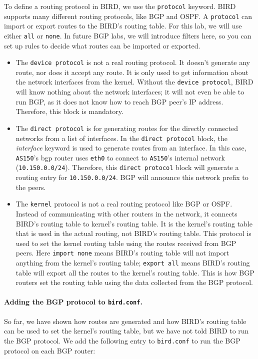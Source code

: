 To define a routing protocol in BIRD, we use the \texttt{protocol} keyword.
BIRD supports many different routing protocols, like BGP and OSPF. A
\texttt{protocol} can import or export routes to the BIRD's routing table.
For this lab, we will use either \texttt{all} or \texttt{none}. In future 
BGP labs, we will introduce filters here, so you can set up 
rules to decide what routes can be imported or exported. 

\begin{itemize}

\item The \texttt{device protocol} is not a real routing protocol. It doesn't
generate any route, nor does it accept any route. It is only used to get
information about the network interfaces from the kernel. Without the
\texttt{device protocol}, BIRD will know nothing about the network
interfaces; it will not even be able to run BGP, as it does not know how
to reach BGP peer's IP address. Therefore, this block is mandatory.

\item The \texttt{direct protocol} is for generating routes for the directly
connected networks from a list of interfaces. In the \texttt{direct protocol}
block, the \textit{interface} keyword is used to generate routes from an
interface. In this case, \texttt{AS150}'s bgp router uses \texttt{eth0} to
connect to \texttt{AS150}'s internal network (\texttt{10.150.0.0/24}).
Therefore, this \texttt{direct protocol} block will generate a routing
entry for \texttt{10.150.0.0/24}. BGP will announce this network
prefix to the peers.

\item The \texttt{kernel} protocol is not a real routing protocol like BGP or
OSPF. Instead of communicating with other routers in the network, it connects
BIRD's routing table to kernel's routing table. It is the kernel's routing table 
that is used in the actual routing, not BIRD's routing table. 
This protocol is used to set the kernel routing table using the routes 
received from BGP peers. Here
\texttt{import none} means BIRD's routing table will not import anything from
the kernel's routing table; \texttt{export all} means BIRD's routing table
will export all the routes to the kernel's routing table. This is how BGP
routers set the routing table using the data collected from the BGP
protocol.

\end{itemize}


\paragraph{Adding the BGP protocol to \texttt{bird.conf}.} 
So far, we have shown how routes are generated and how BIRD's routing table can
be used to set the kernel's routing table, but we have not told BIRD to 
run the BGP protocol. We add the following entry to \texttt{bird.conf}
to run the BGP protocol on each BGP router:

